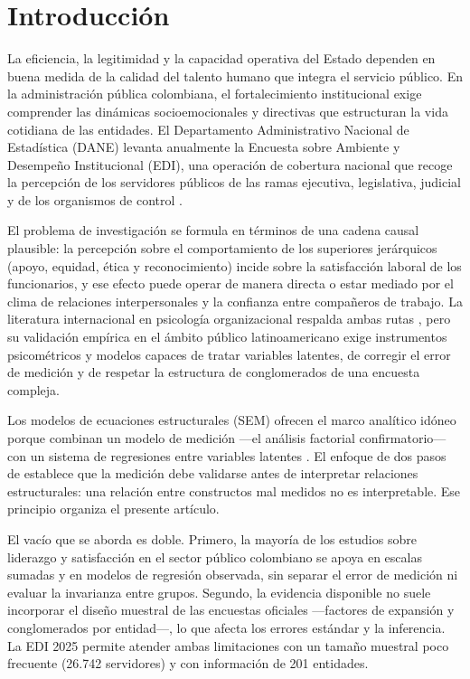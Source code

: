 \documentclass[11pt,a4paper]{article}
\begin{document}
\newpage

\section{Introducción}

La eficiencia, la legitimidad y la capacidad operativa del Estado dependen en buena medida
de la calidad del talento humano que integra el servicio público. En la administración
pública colombiana, el fortalecimiento institucional exige comprender las dinámicas
socioemocionales y directivas que estructuran la vida cotidiana de las entidades. El
Departamento Administrativo Nacional de Estadística (DANE) levanta anualmente la Encuesta
sobre Ambiente y Desempeño Institucional (EDI), una operación de cobertura nacional que
recoge la percepción de los servidores públicos de las ramas ejecutiva, legislativa,
judicial y de los organismos de control \citep{dane2025}.

El problema de investigación se formula en términos de una cadena causal plausible: la
percepción sobre el comportamiento de los superiores jerárquicos (apoyo, equidad, ética y
reconocimiento) incide sobre la satisfacción laboral de los funcionarios, y ese efecto
puede operar de manera directa o estar mediado por el clima de relaciones interpersonales y
la confianza entre compañeros de trabajo. La literatura internacional en psicología
organizacional respalda ambas rutas \citep{avolio2004,schneider2013,judge2004}, pero su
validación empírica en el ámbito público latinoamericano exige instrumentos psicométricos
y modelos capaces de tratar variables latentes, de corregir el error de medición y de
respetar la estructura de conglomerados de una encuesta compleja.

Los modelos de ecuaciones estructurales (SEM) ofrecen el marco analítico idóneo porque
combinan un modelo de medición —el análisis factorial confirmatorio— con un sistema de
regresiones entre variables latentes \citep{bollen1989}. El enfoque de dos pasos de
\citet{anderson1988} establece que la medición debe validarse antes de interpretar
relaciones estructurales: una relación entre constructos mal medidos no es interpretable.
Ese principio organiza el presente artículo.

El vacío que se aborda es doble. Primero, la mayoría de los estudios sobre liderazgo y
satisfacción en el sector público colombiano se apoya en escalas sumadas y en modelos de
regresión observada, sin separar el error de medición ni evaluar la invarianza entre
grupos. Segundo, la evidencia disponible no suele incorporar el diseño muestral de las
encuestas oficiales —factores de expansión y conglomerados por entidad—, lo que afecta los
errores estándar y la inferencia. La EDI 2025 permite atender ambas limitaciones con un
tamaño muestral poco frecuente (26.742 servidores) y con información de 201 entidades.
\end{document}

